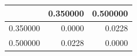 \begin{tabular}{lrr}
\toprule
 & 0.350000 & 0.500000 \\
\midrule
0.350000 & 0.0000 & 0.0228 \\
0.500000 & 0.0228 & 0.0000 \\
\bottomrule
\end{tabular}
